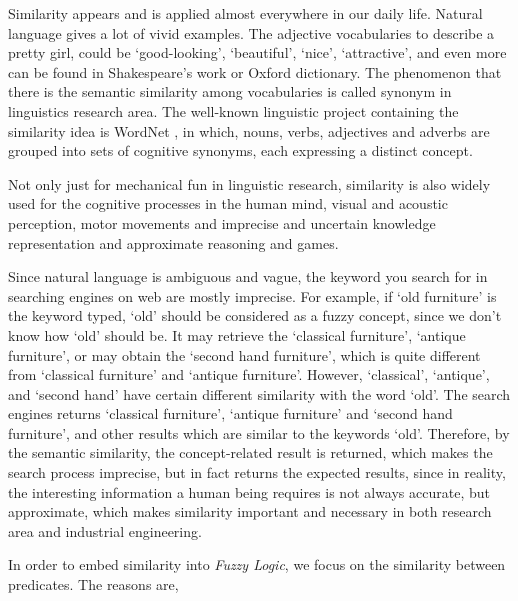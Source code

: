 \label{sec:overview}
Similarity appears and is applied almost everywhere in our daily life. Natural language gives a lot of vivid examples. The adjective vocabularies to describe a pretty girl, could be `good-looking', `beautiful', `nice', `attractive', and even more can be found in Shakespeare's work or Oxford dictionary. The phenomenon that there is the semantic similarity among vocabularies is called synonym in linguistics research area. The well-known linguistic project containing the similarity idea is WordNet \cite{Fel98}, in which, nouns, verbs, adjectives and adverbs are grouped into sets of cognitive synonyms, each expressing a distinct concept. 

Not only just for mechanical fun in linguistic research, similarity is also widely used for the cognitive processes in the human mind, visual and acoustic perception, motor movements and imprecise and uncertain knowledge representation and approximate reasoning and games.

Since natural language is ambiguous and vague, the keyword you search for in searching engines on web are mostly imprecise. For example, if `old furniture' is the keyword typed, `old' should be considered as a fuzzy concept, since we don't know how `old' should be. It may retrieve the `classical furniture', `antique furniture', or may obtain the `second hand furniture', which is quite different from `classical furniture' and `antique furniture'. However, `classical', `antique', and `second hand' have certain different similarity with the word `old'. The search engines returns `classical furniture', `antique furniture' and `second hand furniture', and other results which are similar to the keywords `old'. Therefore, by the semantic similarity, the concept-related result is returned, which makes the search process imprecise, but in fact returns the expected results, since in reality, the interesting information a human being requires is not always accurate, but approximate, which makes similarity important and necessary in both research area and industrial engineering. 

In order to embed similarity into \textit{Fuzzy Logic}, we focus on the similarity between predicates. The reasons are,


